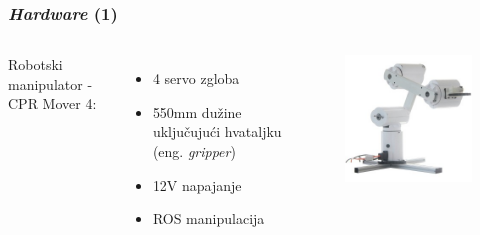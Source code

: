 \documentclass{beamer}
\begin{document}
\begin{frame}
    \frametitle{\emph{Hardware} (1)}
    \begin{columns}
        Robotski manipulator - CPR Mover 4:\newline
        \begin{itemize}
                \item 4 servo zgloba
                \item 550mm dužine uključujući hvataljku (eng. \emph{gripper})
                \item 12V napajanje
                \item ROS manipulacija
        \end{itemize}

        \begin{figure}[h!]
            \centering
            \includegraphics[scale=0.5]{Mover4.jpg}
        \end{figure}
    \end{columns}
\end{frame}
\end{document}
